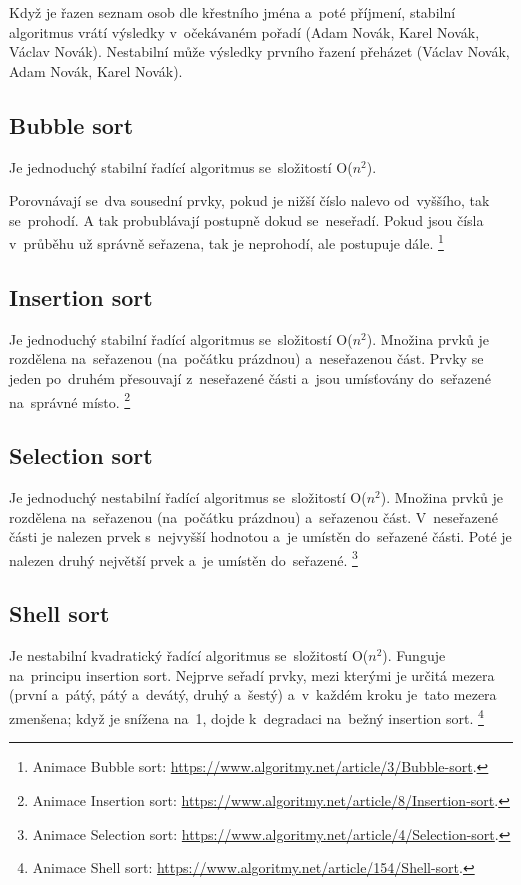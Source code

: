 Když je řazen seznam osob dle křestního jména a~poté příjmení, stabilní algoritmus vrátí výsledky v~očekávaném pořadí (Adam Novák, Karel Novák, Václav Novák). Nestabilní může výsledky prvního řazení přeházet (Václav Novák, Adam Novák, Karel Novák).

\subsection{Bubble sort}

Je jednoduchý stabilní řadící algoritmus se~složitostí O(\( n^2 \)).

Porovnávají se~dva sousední prvky, pokud je nižší číslo nalevo od~vyššího, tak se~prohodí. A tak probublávají postupně dokud se~neseřadí. Pokud jsou čísla v~průběhu už správně seřazena, tak je neprohodí, ale postupuje dále.%
\footnote{Animace Bubble sort: \url{https://www.algoritmy.net/article/3/Bubble-sort}.}

\subsection{Insertion sort}

Je jednoduchý stabilní řadící algoritmus se~složitostí O(\( n^2 \)). Množina prvků je rozdělena na~seřazenou (na~počátku prázdnou) a~neseřazenou část. Prvky se jeden po~druhém přesouvají z~neseřazené části a~jsou umísťovány do~seřazené na~správné místo.%
\footnote{Animace Insertion sort: \url{https://www.algoritmy.net/article/8/Insertion-sort}.}

\subsection{Selection sort}

Je jednoduchý nestabilní řadící algoritmus se~složitostí O(\( n^2 \)). Množina prvků je rozdělena na~seřazenou (na~počátku prázdnou) a~seřazenou část. V~neseřazené části je nalezen prvek s~nejvyšší hodnotou a~je umístěn do~seřazené části. Poté je nalezen druhý největší prvek a~je umístěn do~seřazené.%
\footnote{Animace Selection sort: \url{https://www.algoritmy.net/article/4/Selection-sort}.}

\subsection{Shell sort}

Je nestabilní kvadratický řadící algoritmus se~složitostí O(\( n^2 \)). Funguje na~principu insertion sort. Nejprve seřadí prvky, mezi kterými je určitá mezera (první a~pátý, pátý a~devátý, druhý a~šestý) a~v~každém kroku je~tato mezera zmenšena; když je snížena na~1, dojde k~degradaci na~bežný insertion sort.%
\footnote{Animace Shell sort: \url{https://www.algoritmy.net/article/154/Shell-sort}.}

